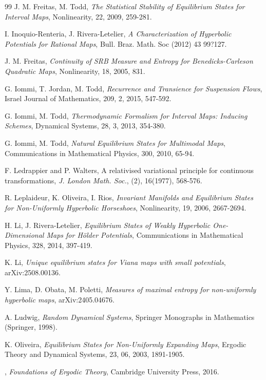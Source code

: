 \documentclass[12pt,a4paper]{amsart}
\theoremstyle{plain}
\begin{document}
\begin{thebibliography}{99}
	 {\sc J. M. Freitas, M. Todd}, {\it The Statistical Stability of Equilibrium States for Interval Maps}, Nonlinearity, 22, 2009, 259-281.
	
	
	 {\sc I. Inoquio-Renteria, J. Rivera-Letelier}, {\it A Characterization of Hyperbolic Potentials for Rational Maps}, Bull. Braz. Math. Soc (2012) 43 99?127.
	
	 {\sc J. M. Freitas}, {\it Continuity of SRB Measure and Entropy for Benedicks-Carleson Quadratic Maps}, Nonlinearity, 18, 2005, 831.
	
	 {\sc G. Iommi, T. Jordan, M. Todd}, {\it Recurrence and Transience for Suspension Flows}, Israel Journal of Mathematics, 209, 2, 2015, 547-592.
	
	 {\sc G. Iommi, M. Todd}, {\it Thermodynamic Formalism for Interval Maps: Inducing Schemes}, Dynamical Systems, 28, 3, 2013, 354-380. 
	
	 {\sc G. Iommi, M. Todd}, {\it Natural Equilibrium States for Multimodal Maps}, Communications in Mathematical Physics, 300, 2010, 65-94. 
	
	\newblock F. Ledrappier and P. Walters, 
	\newblock A relativised variational principle for continuous transformations,
	\newblock \emph{J. London Math. Soc.}, (2), 16(1977), 568-576.
	
	
	 {\sc R. Leplaideur, K. Oliveira, I. Rios}, {\it Invariant Manifolds and Equilibrium States for Non-Uniformly Hyperbolic Horseshoes}, Nonlinearity, 19, 2006, 2667-2694.
	
	
	 {\sc H. Li, J. Rivera-Letelier}, {\it Equilibrium States of Weakly Hyperbolic One-Dimensional Maps for H\"older Potentials}, Communications in Mathematical Physics, 328, 2014, 397-419.
	
	 {\sc K. Li}, {\it 
		Unique equilibrium states for Viana maps with small potentials}, arXiv:2508.00136.
	
	
	 {\sc Y. Lima, D. Obata, M. Poletti}, {\it Measures of maximal entropy for non-uniformly hyperbolic maps}, arXiv:2405.04676.
	
	  {\sc A. Ludwig}, {\it Random Dynamical Systems}, Springer Monographs in Mathematics
	(Springer, 1998).
	
	
	 {\sc K. Oliveira}, {\it Equilibrium States for Non-Uniformly Expanding Maps}, Ergodic Theory and Dynamical Systems, 23, 06, 2003, 1891-1905.
	
	, {\it Foundations of Ergodic Theory}, Cambridge University Press, 2016.
	

\end{thebibliography}
\end{document}
